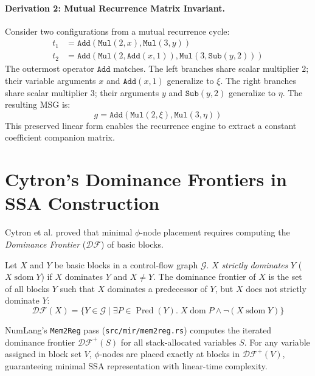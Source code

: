 \paragraph{Derivation 2: Mutual Recurrence Matrix Invariant.}
Consider two configurations from a mutual recurrence cycle:
\begin{align}
t_1 &= \mathtt{Add}(\mathtt{Mul}(2, x), \mathtt{Mul}(3, y)) \\
t_2 &= \mathtt{Add}(\mathtt{Mul}(2, \mathtt{Add}(x, 1)), \mathtt{Mul}(3, \mathtt{Sub}(y, 2)))
\end{align}
The outermost operator $\mathtt{Add}$ matches. The left branches share scalar multiplier $2$; their variable arguments $x$ and $\mathtt{Add}(x, 1)$ generalize to $\xi$. The right branches share scalar multiplier $3$; their arguments $y$ and $\mathtt{Sub}(y, 2)$ generalize to $\eta$.
The resulting MSG is:
\begin{equation}
g = \mathtt{Add}(\mathtt{Mul}(2, \xi), \mathtt{Mul}(3, \eta))
\end{equation}
This preserved linear form enables the recurrence engine to extract a constant coefficient companion matrix.

\section{Cytron's Dominance Frontiers in SSA Construction}
\label{sec:background:cytron_ssa}

Cytron et al. \citep{cytron1991efficiently} proved that minimal $\phi$-node placement requires computing the \emph{Dominance Frontier} ($\mathcal{DF}$) of basic blocks.

\begin{definition}
Let $X$ and $Y$ be basic blocks in a control-flow graph $\mathcal{G}$. $X$ \emph{strictly dominates} $Y$ ($X \operatorname{sdom} Y$) if $X$ dominates $Y$ and $X \ne Y$. The dominance frontier of $X$ is the set of all blocks $Y$ such that $X$ dominates a predecessor of $Y$, but $X$ does not strictly dominate $Y$:
\begin{equation}
\mathcal{DF}(X) = \{ Y \in \mathcal{G} \mid \exists P \in \operatorname{Pred}(Y).\; X \operatorname{dom} P \land \neg(X \operatorname{sdom} Y) \}
\end{equation}
\end{definition}

NumLang's \texttt{Mem2Reg} pass (\texttt{src/mir/mem2reg.rs}) computes the iterated dominance frontier $\mathcal{DF}^+(S)$ for all stack-allocated variables $S$. For any variable assigned in block set $V$, $\phi$-nodes are placed exactly at blocks in $\mathcal{DF}^+(V)$, guaranteeing minimal SSA representation with linear-time complexity.
